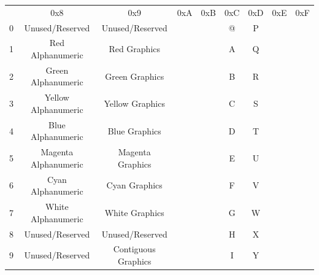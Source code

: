 \begin{table}
\begin{tabular}{|c|c|c|c|c|c|c|c|c|}\hline
   &0x8            & 0x9               		& 0xA&0xB&0xC& 0xD         &0xE& 0xF         \\
 0 &Unused/Reserved&Unused/Reserved    		& \sixel{\bb}{\bb}{\bb}{\bb}{\bb}{\bb} & \sixel{\bb}{\bb}{\bb}{\bb}{\ff}{\bb} & @ & P           & \sixel{\bb}{\bb}{\bb}{\bb}{\bb}{\ff} & \sixel{\bb}{\bb}{\bb}{\bb}{\ff}{\ff}\\
 1 &Red Alphanumeric       &Red Graphics	& \sixel{\ff}{\bb}{\bb}{\bb}{\bb}{\bb} & \sixel{\ff}{\bb}{\bb}{\bb}{\ff}{\bb} & A & Q           & \sixel{\ff}{\bb}{\bb}{\bb}{\bb}{\ff} & \sixel{\ff}{\bb}{\bb}{\bb}{\ff}{\ff}\\
 2 &Green Alphanumeric     &Green Graphics	& \sixel{\bb}{\ff}{\bb}{\bb}{\bb}{\bb} & \sixel{\bb}{\ff}{\bb}{\bb}{\ff}{\bb} & B & R           & \sixel{\bb}{\ff}{\bb}{\bb}{\bb}{\ff} & \sixel{\bb}{\ff}{\bb}{\bb}{\ff}{\ff}\\
 3 &Yellow Alphanumeric    &Yellow Graphics	& \sixel{\ff}{\ff}{\bb}{\bb}{\bb}{\bb} & \sixel{\ff}{\ff}{\bb}{\bb}{\ff}{\bb} & C & S           & \sixel{\ff}{\ff}{\bb}{\bb}{\bb}{\ff} & \sixel{\ff}{\ff}{\bb}{\bb}{\ff}{\ff}\\
 4 &Blue   Alphanumeric    &Blue   Graphics	& \sixel{\bb}{\bb}{\ff}{\bb}{\bb}{\bb} & \sixel{\bb}{\bb}{\ff}{\bb}{\ff}{\bb} & D & T           & \sixel{\bb}{\bb}{\ff}{\bb}{\bb}{\ff} & \sixel{\bb}{\bb}{\ff}{\bb}{\ff}{\ff}\\
 5 &Magenta Alphanumeric   &Magenta Graphics	& \sixel{\ff}{\bb}{\ff}{\bb}{\bb}{\bb} & \sixel{\ff}{\bb}{\ff}{\bb}{\ff}{\bb} & E & U           & \sixel{\ff}{\bb}{\ff}{\bb}{\bb}{\ff} & \sixel{\ff}{\bb}{\ff}{\bb}{\ff}{\ff}\\
 6 &Cyan Alphanumeric      &Cyan Graphics	& \sixel{\bb}{\ff}{\ff}{\bb}{\bb}{\bb} & \sixel{\bb}{\ff}{\ff}{\bb}{\ff}{\bb} & F & V           & \sixel{\bb}{\ff}{\ff}{\bb}{\bb}{\ff} & \sixel{\bb}{\ff}{\ff}{\bb}{\ff}{\ff}\\
 7 &White Alphanumeric     &White Graphics	& \sixel{\ff}{\ff}{\ff}{\bb}{\bb}{\bb} & \sixel{\ff}{\ff}{\ff}{\bb}{\ff}{\bb} & G & W           & \sixel{\ff}{\ff}{\ff}{\bb}{\bb}{\ff} & \sixel{\ff}{\ff}{\ff}{\bb}{\ff}{\ff}\\
 8 &Unused/Reserved&Unused/Reserved		& \sixel{\bb}{\bb}{\bb}{\ff}{\bb}{\bb} & \sixel{\bb}{\bb}{\bb}{\ff}{\ff}{\bb} & H & X           & \sixel{\bb}{\bb}{\bb}{\ff}{\bb}{\ff} & \sixel{\bb}{\bb}{\bb}{\ff}{\ff}{\ff}\\
 9 &Unused/Reserved&Contiguous Graphics		& \sixel{\ff}{\bb}{\bb}{\ff}{\bb}{\bb} & \sixel{\ff}{\bb}{\bb}{\ff}{\ff}{\bb} & I & Y           & \sixel{\ff}{\bb}{\bb}{\ff}{\bb}{\ff} & \sixel{\ff}{\bb}{\bb}{\ff}{\ff}{\ff}\\

\end{tabular}
\end{table}

